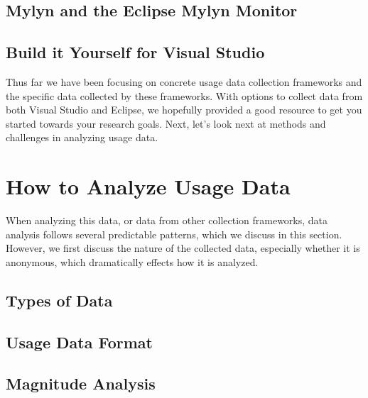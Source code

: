 \subsection{Mylyn and the Eclipse Mylyn Monitor} 
\label{MylynMonitor}






\subsection{Build it Yourself for Visual Studio} 
\label{buildItYourself}



Thus far we have been focusing on concrete usage data collection frameworks and the specific data collected by these frameworks.  With options to collect data from both Visual Studio and Eclipse, we hopefully provided a good resource to get you started towards your research goals.  Next, let's look next at methods and challenges in analyzing usage data.

\section{How to Analyze Usage Data}

When analyzing this data, or data from other collection frameworks, data analysis follows several predictable patterns, which we discuss in this section. However, we first discuss the nature of the collected data, especially whether it is anonymous, which dramatically effects how it is analyzed.

\subsection{Types of Data}


\subsection{Usage Data Format}


\subsection{Magnitude Analysis}


